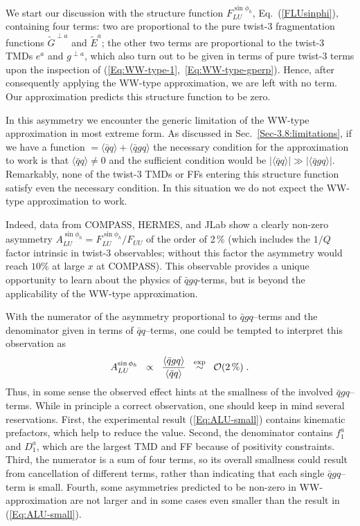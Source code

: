 \documentclass[a4paper,11pt]{article}
\newcommand{\be}{\begin{equation}}
\newcommand{\ee}{\end{equation}}
\newcommand{\la}{\langle}
\newcommand{\ra}{\rangle}
\begin{document}
We start our discussion with the structure function $F_{LU}^{\sin\phi_h}$,
Eq.~(\ref{FLUsinphi}), containing four terms:
two are proportional to the pure twist-3 fragmentation functions
$\tilde{G}^{\perp a}$ and $\tilde{E}^a$; %
the other two
terms are proportional to the twist-3 TMDs $e^a$ and $g^{\perp a}$, which
also turn out to be given in terms of pure twist-3 terms upon the
inspection of (\ref{Eq:WW-type-1},~\ref{Eq:WW-type-gperp}).
Hence, after consequently applying the WW-type approximation, we are left
with no term. Our approximation predicts this structure function to be zero.

In this asymmetry we encounter the generic limitation of the
WW-type approximation in most extreme form. As discussed in
Sec.~\ref{Sec-3.8:limitations}, if we have a function
$=\la\bar{q}q\ra + \la\bar{q}gq\ra$ the necessary condition for
the approximation to work is that $\la\bar{q}q\ra \neq 0$ and the
sufficient condition would be $|\la\bar{q}q\ra|\gg|\la\bar{q}gq\ra|$.
Remarkably, none of the twist-3 TMDs or FFs entering this structure
function satisfy even the necessary condition. In this situation we
do not expect the WW-type approximation to work.

Indeed, data from COMPASS, HERMES, and JLab show a clearly non-zero
asymmetry $A_{LU}^{\sin\phi_h} = F_{LU}^{\sin\phi_h}/F_{UU}$ of the order of 2\,$\%$
\cite{Avakian:2003pk,Airapetian:2006rx,Gohn:2009zz,
Aghasyan:2011ha,Adolph:2014pwc,Gohn:2014zbz} (which includes
the $1/Q$ factor intrinsic in twist-3 observables; without this factor
the asymmetry would reach $10\%$ at large $x$ at COMPASS).
This observable provides a unique opportunity to learn about the
physics of $\bar{q}gq$-terms, but is beyond the applicability of
the WW-type approximation.

With the numerator of the asymmetry proportional to $\bar{q}gq$--terms
and the denominator given in terms of $\bar{q} q$--terms, one could be
tempted to interpret this observation as
\be\label{Eq:ALU-small}
    	A_{LU}^{\sin\phi_h}
	\;\; \propto \;\;\frac{\la\bar{q}gq\ra}{\la\bar{q}q\ra}
    	\;\;\stackrel{\rm exp}{\sim} \;\;
	{\cal O}(2\,\%)
    	\;.
\ee
Thus, in some sense the observed effect hints at the smallness of the
involved $\bar{q}gq$--terms. While in principle a correct observation,
one should keep in mind several reservations. First,
the experimental result (\ref{Eq:ALU-small})
contains kinematic prefactors, which help to reduce the value.
Second, the denominator contains $f_1^a$ and $D_1^a$, which are the
largest TMD and FF because of positivity constraints. Third, the
numerator is a sum of four terms, so its overall smallness could result
from cancellation of different terms, rather than indicating that
each single $\bar{q}gq$--term is small. Fourth, some asymmetries
predicted to be non-zero in WW-approximation are not larger and
in some cases even smaller than the result in (\ref{Eq:ALU-small}).
\end{document}
